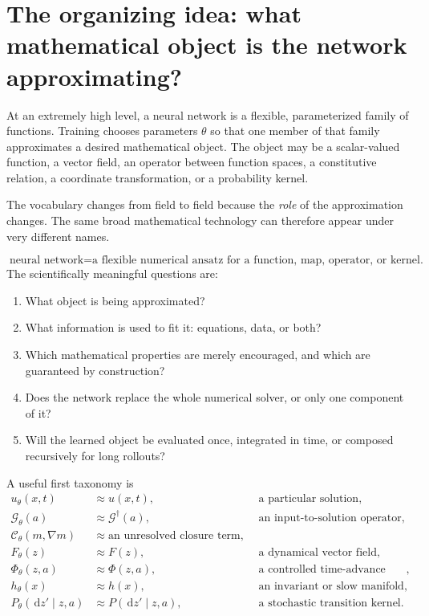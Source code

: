 \documentclass[11pt]{article}
\newcommand{\C}{\mathcal{C}}
\newcommand{\G}{\mathcal{G}}
\newcommand{\dd}{\,\mathrm{d}}
\begin{document}
\tableofcontents
\newpage

\section{The organizing idea: what mathematical object is the network approximating?}

At an extremely high level, a neural network is a flexible, parameterized family of functions. Training chooses parameters \(\theta\) so that one member of that family approximates a desired mathematical object. The object may be a scalar-valued function, a vector field, an operator between function spaces, a constitutive relation, a coordinate transformation, or a probability kernel.

The vocabulary changes from field to field because the \emph{role} of the approximation changes. The same broad mathematical technology can therefore appear under very different names.

\begin{bigidea}
\[
\boxed{
\text{neural network}
=
\text{a flexible numerical ansatz for a function, map, operator, or kernel.}
}
\]
The scientifically meaningful questions are:
\begin{enumerate}
  \item What object is being approximated?
  \item What information is used to fit it: equations, data, or both?
  \item Which mathematical properties are merely encouraged, and which are guaranteed by construction?
  \item Does the network replace the whole numerical solver, or only one component of it?
  \item Will the learned object be evaluated once, integrated in time, or composed recursively for long rollouts?
\end{enumerate}
\end{bigidea}

A useful first taxonomy is
\begin{equation}
\begin{aligned}
 u_\theta(x,t)
 &\approx u(x,t),
 &&\text{a particular solution},\\
 \G_\theta(a)
 &\approx \G^\dagger(a),
 &&\text{an input-to-solution operator},\\
 \C_\theta(m,\nabla m)
 &\approx \text{an unresolved closure term},\\
 F_\theta(z)
 &\approx F(z),
 &&\text{a dynamical vector field},\\
 \Phi_\theta(z,a)
 &\approx \Phi(z,a),
 &&\text{a controlled time-advance map},\\
 h_\theta(x)
 &\approx h(x),
 &&\text{an invariant or slow manifold},\\
 P_\theta(\dd z'\mid z,a)
 &\approx P(\dd z'\mid z,a),
 &&\text{a stochastic transition kernel}.
\end{aligned}
\end{equation}
\end{document}
